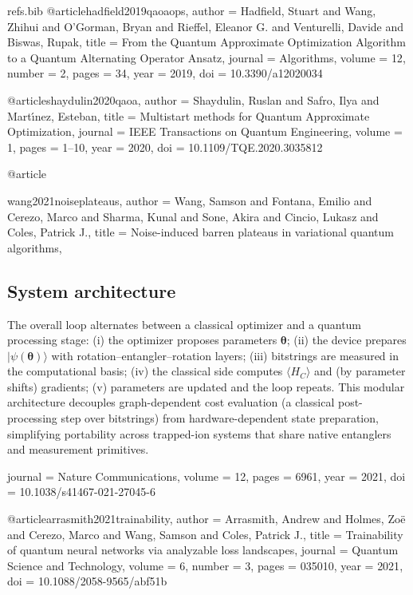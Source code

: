 \begin{filecontents*}{refs.bib}
@article{hadfield2019qaoaops,
  author  = {Hadfield, Stuart and Wang, Zhihui and O'Gorman, Bryan and Rieffel, Eleanor G. and Venturelli, Davide and Biswas, Rupak},
  title   = {From the Quantum Approximate Optimization Algorithm to a Quantum Alternating Operator Ansatz},
  journal = {Algorithms},
  volume  = {12},
  number  = {2},
  pages   = {34},
  year    = {2019},
  doi     = {10.3390/a12020034}
}

@article{shaydulin2020qaoa,
  author  = {Shaydulin, Ruslan and Safro, Ilya and Mart{\'\i}nez, Esteban},
  title   = {Multistart methods for Quantum Approximate Optimization},
  journal = {IEEE Transactions on Quantum Engineering},
  volume  = {1},
  pages   = {1--10},
  year    = {2020},
  doi     = {10.1109/TQE.2020.3035812}
}

@article{wang2021noiseplateaus,
  author  = {Wang, Samson and Fontana, Emilio and Cerezo, Marco and Sharma, Kunal and Sone, Akira and Cincio, Lukasz and Coles, Patrick J.},
  title   = {Noise-induced barren plateaus in variational quantum algorithms},

\subsection{System architecture}
The overall loop alternates between a classical optimizer and a quantum processing stage: (i) the optimizer proposes parameters $\boldsymbol{\theta}$; (ii) the device prepares $|\psi(\boldsymbol{\theta})\rangle$ with rotation--entangler--rotation layers; (iii) bitstrings are measured in the computational basis; (iv) the classical side computes $\langle H_C\rangle$ and (by parameter shifts) gradients; (v) parameters are updated and the loop repeats. This modular architecture decouples graph-dependent cost evaluation (a classical post-processing step over bitstrings) from hardware-dependent state preparation, simplifying portability across trapped-ion systems that share native entanglers and measurement primitives.

  journal = {Nature Communications},
  volume  = {12},
  pages   = {6961},
  year    = {2021},
  doi     = {10.1038/s41467-021-27045-6}
}

@article{arrasmith2021trainability,
  author  = {Arrasmith, Andrew and Holmes, Zo{\"e} and Cerezo, Marco and Wang, Samson and Coles, Patrick J.},
  title   = {Trainability of quantum neural networks via analyzable loss landscapes},
  journal = {Quantum Science and Technology},
  volume  = {6},
  number  = {3},
  pages   = {035010},
  year    = {2021},
  doi     = {10.1088/2058-9565/abf51b}
}


\end{filecontents*}
